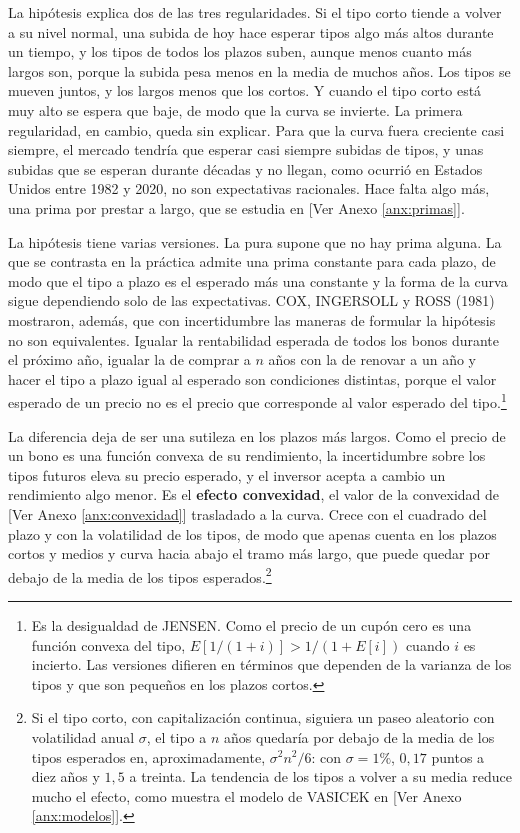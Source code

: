 \documentclass[10pt,a4paper]{article}
\newcommand{\authorfont}[1]{{\fontfamily{EBGaramond-TLF}\selectfont #1}}
\begin{document}
La hipótesis explica dos de las tres regularidades. Si el tipo corto tiende a volver a su nivel normal, una subida de hoy hace esperar tipos algo más altos durante un tiempo, y los tipos de todos los plazos suben, aunque menos cuanto más largos son, porque la subida pesa menos en la media de muchos años. Los tipos se mueven juntos, y los largos menos que los cortos. Y cuando el tipo corto está muy alto se espera que baje, de modo que la curva se invierte. La primera regularidad, en cambio, queda sin explicar. Para que la curva fuera creciente casi siempre, el mercado tendría que esperar casi siempre subidas de tipos, y unas subidas que se esperan durante décadas y no llegan, como ocurrió en Estados Unidos entre 1982 y 2020, no son expectativas racionales. Hace falta algo más, una prima por prestar a largo, que se estudia en [\authorfont{Ver Anexo \ref{anx:primas}}].

La hipótesis tiene varias versiones. La pura supone que no hay prima alguna. La que se contrasta en la práctica admite una prima constante para cada plazo, de modo que el tipo a plazo es el esperado más una constante y la forma de la curva sigue dependiendo solo de las expectativas. COX, INGERSOLL y ROSS (1981) mostraron, además, que con incertidumbre las maneras de formular la hipótesis no son equivalentes. Igualar la rentabilidad esperada de todos los bonos durante el próximo año, igualar la de comprar a $n$ años con la de renovar a un año y hacer el tipo a plazo igual al esperado son condiciones distintas, porque el valor esperado de un precio no es el precio que corresponde al valor esperado del tipo.\footnote{%
    Es la desigualdad de JENSEN. Como el precio de un cupón cero es una función convexa del tipo, $E\left[1/(1+i)\right]>1/(1+E[i])$ cuando $i$ es incierto. Las versiones difieren en términos que dependen de la varianza de los tipos y que son pequeños en los plazos cortos.
}

La diferencia deja de ser una sutileza en los plazos más largos. Como el precio de un bono es una función convexa de su rendimiento, la incertidumbre sobre los tipos futuros eleva su precio esperado, y el inversor acepta a cambio un rendimiento algo menor. Es el \textbf{efecto convexidad}, el valor de la convexidad de [\authorfont{Ver Anexo \ref{anx:convexidad}}] trasladado a la curva. Crece con el cuadrado del plazo y con la volatilidad de los tipos, de modo que apenas cuenta en los plazos cortos y medios y curva hacia abajo el tramo más largo, que puede quedar por debajo de la media de los tipos esperados.\footnote{%
    Si el tipo corto, con capitalización continua, siguiera un paseo aleatorio con volatilidad anual $\sigma$, el tipo a $n$ años quedaría por debajo de la media de los tipos esperados en, aproximadamente, $\sigma^2n^2/6$: con $\sigma=1\%$, $0{,}17$ puntos a diez años y $1{,}5$ a treinta. La tendencia de los tipos a volver a su media reduce mucho el efecto, como muestra el modelo de VASICEK en [\authorfont{Ver Anexo \ref{anx:modelos}}].
}
\end{document}
